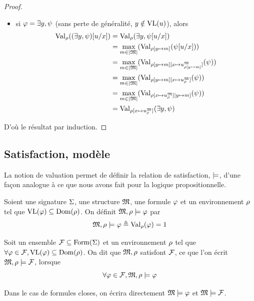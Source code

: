 \begin{proof}
\begin{itemize}
\begin{align*}
      &= \min_{m\in\carMM}(\ValP{\env[x\mapsto \toMMI{u}][y\mapsto m]}(\varFP))\\
      &= \ValP{\env[x\mapsto \toMMI{u}]}(\forall y, \varFP)
    \end{align*}
  \item si $\varphi = \exists y, \psi$ (sans perte de généralité,
    $y\notin \operatorname{VL}(u)$), alors
    \begin{align*}
      \operatorname{Val}_{\rho}((\exists y,\psi)[u/x]) &= \operatorname{Val}_{\rho}(\exists y,\psi[u/x])\\
      &= \max_{m\in\left\vert \mathfrak{M}\right\vert}(\operatorname{Val}_{\rho[y \mapsto m]}(\psi[u/x]))\\
      &= \max_{m\in\left\vert \mathfrak{M}\right\vert}(\operatorname{Val}_{\rho[y\mapsto m]
        [x\mapsto u^{\mathfrak{M}}_{\rho[y\mapsto m]}]}(\psi))\\
      &= \max_{m\in\left\vert \mathfrak{M}\right\vert}(\operatorname{Val}_{\rho[y\mapsto m][x\mapsto u^{\mathfrak{M}}_{\rho}]}(\psi))\\
      &= \max_{m\in\left\vert \mathfrak{M}\right\vert}(\operatorname{Val}_{\rho[x\mapsto u^{\mathfrak{M}}_{\rho}][y\mapsto m]}(\psi))\\
      &= \operatorname{Val}_{\rho[x\mapsto u^{\mathfrak{M}}_{\rho}]}(\exists y, \psi)
    \end{align*}
  \end{itemize}
  D'où le résultat par induction.
\end{proof}

\subsection{Satisfaction, modèle}

La notion de valuation permet de définir la relation de satisfaction, $\models$,
d'une façon analogue à ce que nous avons fait pour la logique propositionnelle.

\begin{definition}[Satisfaction]
  Soient une signature $\Sigma$, une structure $\mathfrak{M}$, une formule
  $\varphi$ et un environnement $\rho$ tel que
  $\operatorname{VL}(\varphi)\subseteq\operatorname{Dom}(\rho)$.
  On définit $\mathfrak{M},\rho\models\varphi$ par
  \[\mathfrak{M},\rho\models\varphi \triangleq \operatorname{Val}_{\rho}(\varphi) = 1\]

  \noindent
  Soit un ensemble $\mathcal F\subseteq\operatorname{Form}(\Sigma)$ et un environnement
  $\rho$ tel que
  $\forall \varphi\in\mathcal F, \operatorname{VL}(\varphi)\subseteq\operatorname{Dom}(\rho)$.
  On dit que $\mathfrak{M},\rho$ satisfont $\mathcal F$, ce que l'on écrit
  $\mathfrak{M},\rho\models\mathcal F$, lorsque
  \[\forall \varphi \in \mathcal F, \mathfrak{M},\rho\models\varphi\]

  \noindent
  Dans le cas de formules closes, on écrira directement
  $\mathfrak{M}\models\varphi$ et $\mathfrak{M}\models\mathcal F$.
\end{definition}

